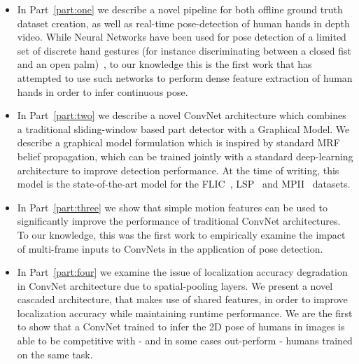 \begin{itemize}

\item In Part~\ref{part:one} we describe a novel pipeline for both offline
ground truth dataset creation, as well as real-time pose-detection of human
hands in depth video. While Neural Networks have been used for pose detection
of a limited set of discrete hand gestures (for instance discriminating between
a closed fist and an open palm)~\cite{nagi,nowlan}, to our knowledge this is
the first work that has attempted to use such networks to perform dense feature
extraction of human hands in order to infer continuous pose.

\item In Part~\ref{part:two} we describe a novel ConvNet architecture which
combines a traditional sliding-window based part detector with a Graphical
Model. We describe a graphical model formulation which is inspired by standard
MRF belief propagation, which can be trained jointly with a standard
deep-learning architecture to improve detection performance. At the time of
writing, this model is the state-of-the-art model for the FLIC~\cite{modec},
LSP~\cite{Johnson10} and MPII~\cite{andriluka14cvpr} datasets.

\item In Part~\ref{part:three} we show that simple motion features can be used
to significantly improve the performance of traditional ConvNet architectures.
To our knowledge, this was the first work to empirically examine the impact of
multi-frame inputs to ConvNets in the application of pose detection.

\item In Part~\ref{part:four} we examine the issue of localization accuracy
degradation in ConvNet architecture due to spatial-pooling layers. We present a
novel cascaded architecture, that makes use of shared features, in order to
improve localization accuracy while maintaining runtime performance. We are the
first to show that a ConvNet trained to infer the 2D pose of humans in images
is able to be competitive with - and in some cases out-perform - humans trained
on the same task.

\end{itemize}
